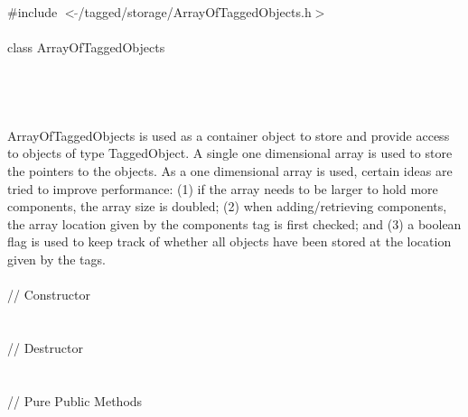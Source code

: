 
   \\
\indent \#include $<\tilde{ }$/tagged/storage/ArrayOfTaggedObjects.h$>$ \\

  \\
\indent class ArrayOfTaggedObjects  \\

 \\
 \\
\indent{} \\

  \\
\indent ArrayOfTaggedObjects is used as a container object to store and
provide access to objects of type TaggedObject. A single one dimensional
array is used to store the pointers to the objects. As a one dimensional
array is used, certain ideas are tried to improve performance: (1) if
the array needs to be larger to hold more components, the array size
is doubled; (2) when adding/retrieving components, the array location
given by the components tag is first checked; and (3) a boolean flag is
used to keep track of whether all objects have been stored at the
location given by the tags.\\

  \\
\indent // Constructor  \\
 \\\\
\indent // Destructor \\
 \\  \\
\indent // Pure Public Methods \\
\\
\\
\\
\\
\\
\\
\\
\\
\\


